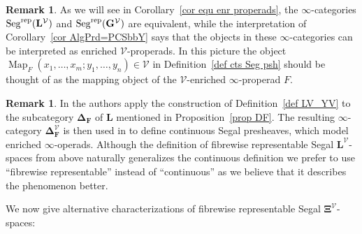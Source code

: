 \documentclass{amsart}
\numberwithin{theorem}{subsection}
\theoremstyle{definition}
\newtheorem{remark}[theorem]{Remark}
\newcommand{\finsetskel}{\mathbf{F}}
\newcommand{\xMap}{\operatorname{Map}}
\newcommand{\xV}{\mathcal{V}}
\newcommand{\name}[1]{\ensuremath{\text{\textup{#1}}}}
\newcommand{\simp}{\mathbf{\Delta}}
\newcommand{\levelg}{\mathbf{L}}
\newcommand{\levelV}{\levelg^\xV}
\newcommand{\bbY}{\mathbf{G}}
\newcommand{\bbYV}{\bbY^{\xV}}
\newcommand{\gc}{\mathbf{\Xi}}
\newcommand{\gcV}{\gc^{\xV}}
\newcommand{\Seg}{\name{Seg}}
\newcommand{\Segrep}{\Seg^{\name{rep}}}
\begin{document}
\begin{remark}
As we will see in Corollary~\ref{cor equ enr properads}, the $\infty$-categories $\Segrep(\levelV)$ and $\Segrep(\bbYV)$ are equivalent, while the interpretation of Corollary~\ref{cor AlgPrd=PCSbbY} says that the objects in these $\infty$-categories can be interpreted as enriched $\xV$-properads. 
In this picture the object $\xMap_F(x_1,\ldots, x_m;y_1, \ldots, y_n)\in \xV$ in Definition~\ref{def cts Seg psh} should be thought of as the mapping object of the $\xV$-enriched $\infty$-properad $F$.
\end{remark}

\begin{remark}\label{rem repcts}
In \cite{ChuHaugseng} the authors apply the construction of Definition~\ref{def LV_YV} to the subcategory $\simp_{\finsetskel}$ of $\levelg$ mentioned in Proposition~\ref{prop DF}. 
The resulting $\infty$-category $\simp^\xV_{\finsetskel}$ is then used in \cite[Definition 2.3.9]{ChuHaugseng} to define continuous Segal presheaves, which model enriched $\infty$-operads. 
Although the definition of fibrewise representable Segal $\levelV$-spaces from above naturally generalizes the continuous definition \cite[Definition 2.3.9]{ChuHaugseng} we prefer to use ``fibrewise representable'' instead of ``continuous'' as we believe that it describes the phenomenon better.
\end{remark}


We now give alternative characterizations of fibrewise representable Segal $\gcV$-spaces:
\end{document}
